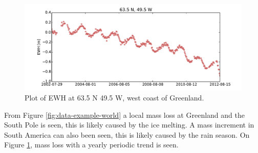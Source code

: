 \begin{figure}[H]
	\centering
	\includegraphics[width=\textwidth]{figures/data-example-scatter}
	\caption{Plot of EWH at 63.5 N 49.5 W, west coast of Greenland.}
	\label{fig:data-example-scatter}
\end{figure}

From Figure \ref{fig:data-example-world} a local mass loss at Greenland and the South Pole is seen, this is likely caused by the ice melting.
A mass increment in South America can also been seen, this is likely caused by the rain season.
On Figure \ref{fig:data-example-scatter}, mass loss with a yearly periodic trend is seen.
